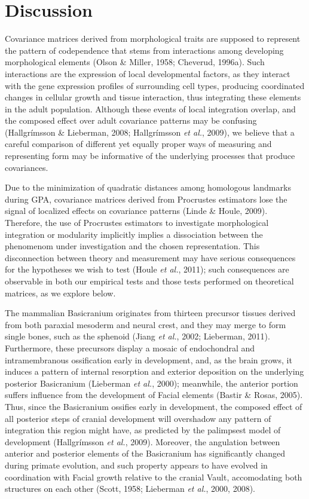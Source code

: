\documentclass[12pt,twoside]{report}
\begin{document}
\section{Discussion}\label{discussion}

Covariance matrices derived from morphological traits are supposed to
represent the pattern of codependence that stems from interactions among
developing morphological elements (Olson \& Miller, 1958; Cheverud,
1996a). Such interactions are the expression of local developmental
factors, as they interact with the gene expression profiles of
surrounding cell types, producing coordinated changes in cellular growth
and tissue interaction, thus integrating these elements in the adult
population. Although these events of local integration overlap, and the
composed effect over adult covariance patterns may be confusing
(Hallgrímsson \& Lieberman, 2008; Hallgrímsson \emph{et al.}, 2009), we
believe that a careful comparison of different yet equally proper ways
of measuring and representing form may be informative of the underlying
processes that produce covariances.

Due to the minimization of quadratic distances among homologous
landmarks during GPA, covariance matrices derived from Procrustes
estimators lose the signal of localized effects on covariance patterns
(Linde \& Houle, 2009). Therefore, the use of Procrustes estimators to
investigate morphological integration or modularity implicitly implies a
dissociation between the phenomenom under investigation and the chosen
representation. This disconnection between theory and measurement may
have serious consequences for the hypotheses we wish to test (Houle
\emph{et al.}, 2011); such consequences are observable in both our
empirical tests and those tests performed on theoretical matrices, as we
explore below.

The mammalian Basicranium originates from thirteen precursor tissues
derived from both paraxial mesoderm and neural crest, and they may merge
to form single bones, such as the sphenoid (Jiang \emph{et al.}, 2002;
Lieberman, 2011). Furthermore, these precursors display a mosaic of
endochondral and intramembranous ossification early in development, and,
as the brain grows, it induces a pattern of internal resorption and
exterior deposition on the underlying posterior Basicranium (Lieberman
\emph{et al.}, 2000); meanwhile, the anterior portion suffers influence
from the development of Facial elements (Bastir \& Rosas, 2005). Thus,
since the Basicranium ossifies early in development, the composed effect
of all posterior steps of cranial development will overshadow any
pattern of integration this region might have, as predicted by the
palimpsest model of development (Hallgrímsson \emph{et al.}, 2009).
Moreover, the angulation between anterior and posterior elements of the
Basicranium has significantly changed during primate evolution, and such
property appears to have evolved in coordination with Facial growth
relative to the cranial Vault, accomodating both structures on each
other (Scott, 1958; Lieberman \emph{et al.}, 2000, 2008).
\end{document}

